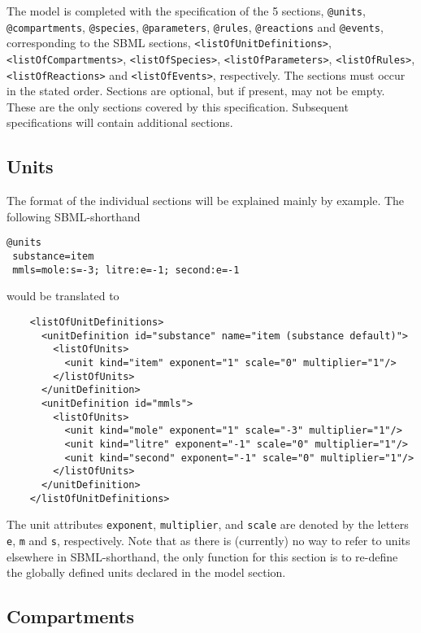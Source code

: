 \documentclass[11pt,a4paper]{article}
\begin{document}
The model is completed with the
specification of the 5 sections, \verb$@units$, \verb$@compartments$,
\verb$@species$,
\verb$@parameters$, \verb$@rules$, \verb$@reactions$ and \verb$@events$, corresponding to the SBML
sections, \verb$<listOfUnitDefinitions>$, \verb$<listOfCompartments>$, \verb$<listOfSpecies>$,
\verb$<listOfParameters>$, \verb$<listOfRules>$, \verb$<listOfReactions>$ and \verb$<listOfEvents>$,
respectively. The sections must occur in the stated order. Sections
are optional, but if present, may not be empty. These are the only
sections covered by this specification. Subsequent specifications will
contain additional sections. 

\subsection{Units}

The format of the individual sections will be explained mainly by
example. The following SBML-shorthand

{\small
\begin{verbatim}
@units
 substance=item
 mmls=mole:s=-3; litre:e=-1; second:e=-1
\end{verbatim}}

\noindent would be translated to

{\small
\begin{verbatim}
    <listOfUnitDefinitions>
      <unitDefinition id="substance" name="item (substance default)">
        <listOfUnits>
          <unit kind="item" exponent="1" scale="0" multiplier="1"/>
        </listOfUnits>
      </unitDefinition>
      <unitDefinition id="mmls">
        <listOfUnits>
          <unit kind="mole" exponent="1" scale="-3" multiplier="1"/>
          <unit kind="litre" exponent="-1" scale="0" multiplier="1"/>
          <unit kind="second" exponent="-1" scale="0" multiplier="1"/>
        </listOfUnits>
      </unitDefinition>
    </listOfUnitDefinitions>
\end{verbatim}}

The unit attributes \verb$exponent$, \verb$multiplier$, and \verb$scale$
are denoted by the letters \verb$e$, \verb$m$ and
\verb$s$, respectively. Note that as there is (currently)
no way to refer to units elsewhere in SBML-shorthand, the only
function for this section is to re-define the globally defined units
declared in the model section.

\subsection{Compartments}
\end{document}
